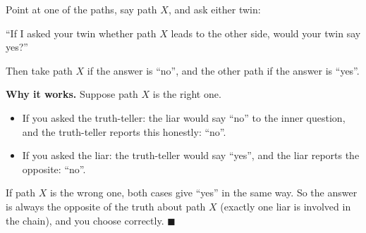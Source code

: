 Point at one of the paths, say path $X$, and ask either twin:
\begin{center}
``If I asked your twin whether path $X$ leads to the other side, would your twin say yes?''
\end{center}
Then take path $X$ if the answer is ``no'', and the other path if the answer is ``yes''.

\textbf{Why it works.} Suppose path $X$ is the right one.
\begin{itemize}
\item If you asked the truth-teller: the liar would say ``no'' to the inner question, and the truth-teller reports this honestly: ``no''.
\item If you asked the liar: the truth-teller would say ``yes'', and the liar reports the opposite: ``no''.
\end{itemize}
If path $X$ is the wrong one, both cases give ``yes'' in the same way. So the answer is always the opposite of the truth about path $X$ (exactly one liar is involved in the chain), and you choose correctly. $\blacksquare$
